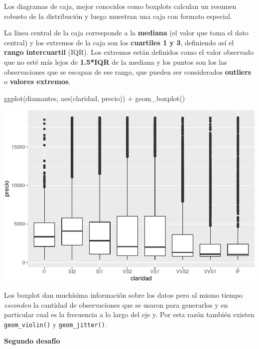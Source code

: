\documentclass[
  openany]{book}
\newenvironment{Shaded}{\begin{snugshade}}{\end{snugshade}}
\newcommand{\FunctionTok}[1]{\textcolor[rgb]{0.00,0.00,0.00}{#1}}
\newcommand{\NormalTok}[1]{#1}
\newcommand{\SpecialCharTok}[1]{\textcolor[rgb]{0.00,0.00,0.00}{#1}}
\begin{document}
Los diagramas de caja, mejor conocidos como boxplots calculan un resumen robusto de la distribución y luego muestran una caja con formato especial.

La línea central de la caja corresponde a la \textbf{mediana} (el valor que toma el dato central) y los extremos de la caja son los \textbf{cuartiles 1 y 3}, definiendo así el \textbf{rango intercuartil} (IQR).
Los extremos están definidos como el valor observado que no esté más lejos de \textbf{1.5*IQR} de la mediana y los puntos son los las observaciones que se escapan de ese rango, que pueden ser considerados \textbf{outliers} o \textbf{valores extremos}.

\begin{Shaded}
\begin{Highlighting}[]
\FunctionTok{ggplot}\NormalTok{(diamantes, }\FunctionTok{aes}\NormalTok{(claridad, precio)) }\SpecialCharTok{+}
  \FunctionTok{geom\_boxplot}\NormalTok{()}
\end{Highlighting}
\end{Shaded}

\begin{center}\includegraphics[width=1\linewidth]{DT6_files/figure-latex/unnamed-chunk-68-1} \end{center}

Los boxplot dan muchísima información sobre los datos pero al mismo tiempo \emph{esconden} la cantidad de observaciones que se usaron para generarlos y en particular cual es la frecuencia a lo largo del eje y.
Por esta razón también existen \texttt{geom\_violin()} y \texttt{geom\_jitter()}.

\textbf{Segundo desafío}
\end{document}

